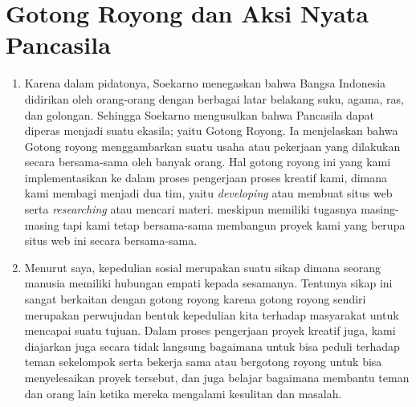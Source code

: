 \documentclass[12pt]{article}
\begin{document}
\section{Gotong Royong dan Aksi Nyata Pancasila}
\begin{enumerate}[label=\alph*)]
  \item
    Karena dalam pidatonya, Soekarno menegaskan bahwa Bangsa Indonesia 
    didirikan oleh orang-orang dengan berbagai latar belakang suku, agama, ras,
    dan golongan. Sehingga Soekarno mengusulkan bahwa Pancasila dapat diperas 
    menjadi suatu ekasila; yaitu Gotong Royong. Ia menjelaskan bahwa
    Gotong royong menggambarkan suatu usaha atau pekerjaan yang dilakukan secara
    bersama-sama oleh banyak orang. Hal gotong royong ini yang kami implementasikan
    ke dalam  proses pengerjaan proses kreatif kami, dimana kami membagi menjadi dua tim,
    yaitu \emph{developing} atau membuat situs web serta \emph{researching} atau
    mencari materi. meskipun memiliki tugasnya masing-masing tapi kami
    tetap bersama-sama membangun proyek kami yang berupa situs web ini secara
    bersama-sama.
  \item
    Menurut saya, kepedulian sosial merupakan suatu sikap dimana seorang
    manusia memiliki hubungan empati kepada sesamanya. Tentunya sikap ini
    sangat berkaitan dengan gotong royong karena gotong royong sendiri
    merupakan perwujudan bentuk kepedulian kita terhadap masyarakat
    untuk mencapai suatu tujuan. Dalam proses pengerjaan proyek kreatif juga,
    kami diajarkan juga secara tidak langsung bagaimana untuk bisa peduli
    terhadap teman sekelompok serta bekerja sama atau bergotong royong untuk
    bisa menyelesaikan proyek tersebut, dan juga belajar bagaimana membantu
    teman dan orang lain ketika mereka mengalami kesulitan dan masalah.
\end{enumerate}

\pagebreak
\end{document}
